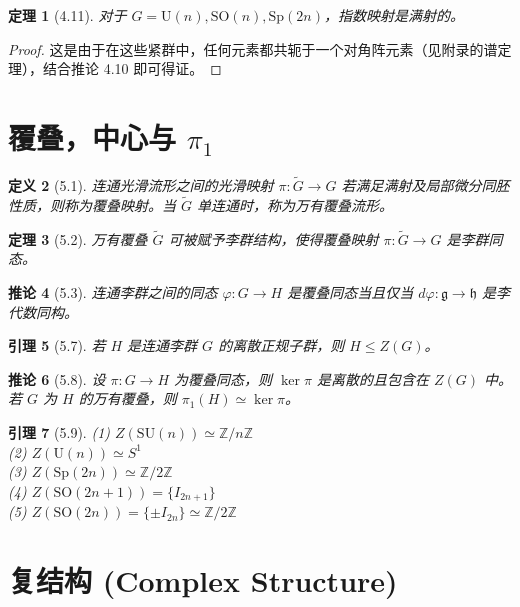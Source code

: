 \documentclass[12pt, a4paper]{ctexart}
\newtheorem{theorem}{定理}[section]
\newtheorem{lemma}[theorem]{引理}
\newtheorem{corollary}[theorem]{推论}
\newtheorem{definition}[theorem]{定义}
\begin{document}
\begin{theorem}[4.11]
对于 $G = \mathrm{U}(n), \mathrm{SO}(n), \mathrm{Sp}(2n)$，指数映射是满射的。
\end{theorem}
\begin{proof}
这是由于在这些紧群中，任何元素都共轭于一个对角阵元素（见附录的谱定理），结合推论 4.10 即可得证。
\end{proof}

\section{覆叠，中心与 $\pi_1$}

\begin{definition}[5.1]
连通光滑流形之间的光滑映射 $\pi: \widetilde{G} \to G$ 若满足满射及局部微分同胚性质，则称为覆叠映射。当 $\widetilde{G}$ 单连通时，称为万有覆叠流形。
\end{definition}

\begin{theorem}[5.2]
万有覆叠 $\widetilde{G}$ 可被赋予李群结构，使得覆叠映射 $\pi: \widetilde{G} \to G$ 是李群同态。
\end{theorem}

\begin{corollary}[5.3]
连通李群之间的同态 $\varphi: G \to H$ 是覆叠同态当且仅当 $d\varphi: \mathfrak{g} \to \mathfrak{h}$ 是李代数同构。
\end{corollary}

\begin{lemma}[5.7]
若 $H$ 是连通李群 $G$ 的离散正规子群，则 $H \le Z(G)$。
\end{lemma}

\begin{corollary}[5.8]
设 $\pi: G \to H$ 为覆叠同态，则 $\ker \pi$ 是离散的且包含在 $Z(G)$ 中。若 $G$ 为 $H$ 的万有覆叠，则 $\pi_1(H) \simeq \ker \pi$。
\end{corollary}

\begin{lemma}[5.9]
(1) $Z(\mathrm{SU}(n)) \simeq \mathbb{Z}/n\mathbb{Z}$\\
(2) $Z(\mathrm{U}(n)) \simeq S^1$\\
(3) $Z(\mathrm{Sp}(2n)) \simeq \mathbb{Z}/2\mathbb{Z}$\\
(4) $Z(\mathrm{SO}(2n+1)) = \{I_{2n+1}\}$\\
(5) $Z(\mathrm{SO}(2n)) = \{\pm I_{2n}\} \simeq \mathbb{Z}/2\mathbb{Z}$
\end{lemma}

\section{复结构 (Complex Structure)}
\end{document}
